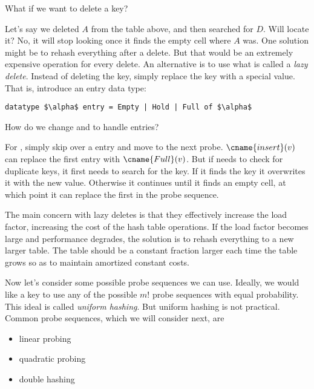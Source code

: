 \begin{question}
What if we want to delete a key?
\end{question}

Let's say we deleted $A$ from the table
above, and then searched for $D$. Will  locate it?  No, it will
stop looking once it finds the empty cell where $A$ was. One solution
might be to rehash everything after a delete.  But that would be an extremely
expensive operation for every delete. An alternative is to use what is
called a \emph{lazy delete}.  Instead of deleting the key, simply
replace the key with a special  value.  That is, introduce
an entry data type:

\begin{lstlisting}[numbers=none]
datatype $\alpha$ entry = Empty | Hold | Full of $\alpha$
\end{lstlisting}
\begin{question}
How do we change  and  to handle
 entries?
\end{question}
For , simply skip over a  entry and move to
the next probe.  $\cname{insert}(v)$ can replace the first
 entry with $\cname{Full}(v)$.  But if 
needs to check for duplicate keys, it first needs to search for the
key. If it finds the key it overwrites it with the new
value. Otherwise it continues until it finds an empty cell, at which
point it can replace the first  in the probe sequence.

The main concern with lazy deletes is that they effectively increase the
load factor, increasing the cost of the hash table operations. If the
load factor becomes large and performance degrades, the solution is to
rehash everything to a new larger table.  The table should be a
constant fraction larger each time the table grows so as to maintain
amortized constant costs.

Now let's consider some possible probe sequences we can use.  Ideally,
we would like a key to use any of the possible $m!$ probe sequences
with equal probability.  This ideal is called \emph{uniform
  hashing}. But uniform hashing is not practical. Common probe
sequences, which we will consider next, are
\begin{itemize}
\item linear probing
\item quadratic probing
\item double hashing
\end{itemize}

